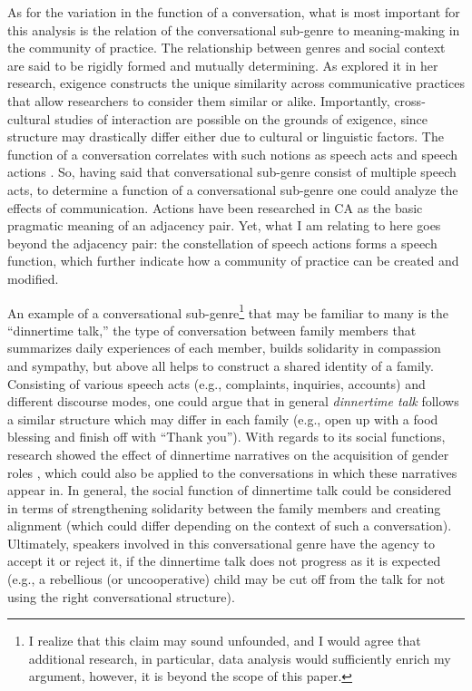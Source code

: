 \documentclass[12pt]{article}
\begin{document}
As for the variation in the function of a conversation, what is most important for this analysis is the relation of the conversational sub-genre to meaning-making in the community of practice. The relationship between genres and social context are said to be rigidly formed and mutually determining. As \textcite{mayes2005} explored it in her research, exigence constructs the unique similarity across communicative practices that allow researchers to consider them similar or alike. Importantly, cross-cultural studies of interaction are possible on the grounds of exigence, since structure may drastically differ either due to cultural or linguistic factors. The function of a conversation correlates with such notions as speech acts \parencite{searle2011} and speech actions \parencite{levinson2013}. So, having said that conversational sub-genre consist of multiple speech acts, to determine a function of a conversational sub-genre one could analyze the effects of communication. Actions have been researched in CA as the basic pragmatic meaning of an adjacency pair. Yet, what I am relating to here goes beyond the adjacency pair: the constellation of speech actions forms a speech function, which further indicate how a community of practice can be created and modified.

An example of a conversational sub-genre\footnote{I realize that this claim may sound unfounded, and I would agree that additional research, in particular, data analysis would sufficiently enrich my argument, however, it is beyond the scope of this paper.} that may be familiar to many is the ``dinnertime talk,'' the type of conversation between family members that summarizes daily experiences of each member, builds solidarity in compassion and sympathy, but above all helps to construct a shared identity of a family. Consisting of various speech acts (e.g., complaints, inquiries, accounts) and different discourse modes, one could argue that in general \textit{dinnertime talk} follows a similar structure which may differ in each family (e.g., open up with a food blessing and finish off with ``Thank you''). With regards to its social functions, research showed the effect of dinnertime narratives on the acquisition of gender roles \parencite{ochs2001}, which could also be applied to the conversations in which these narratives appear in. In general, the social function of dinnertime talk could be considered in terms of strengthening solidarity between the family members and creating alignment (which could differ depending on the context of such a conversation). Ultimately, speakers involved in this conversational genre have the agency to accept it or reject it, if the dinnertime talk does not progress as it is expected (e.g., a rebellious (or uncooperative) child may be cut off from the talk for not using the right conversational structure). 
\end{document}
